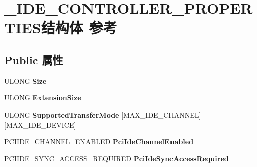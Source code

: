 \hypertarget{struct___i_d_e___c_o_n_t_r_o_l_l_e_r___p_r_o_p_e_r_t_i_e_s}{}\section{\+\_\+\+I\+D\+E\+\_\+\+C\+O\+N\+T\+R\+O\+L\+L\+E\+R\+\_\+\+P\+R\+O\+P\+E\+R\+T\+I\+E\+S结构体 参考}
\label{struct___i_d_e___c_o_n_t_r_o_l_l_e_r___p_r_o_p_e_r_t_i_e_s}
\subsection*{Public 属性}
\begin{DoxyCompactItemize}
\item 
\mbox{\label{struct___i_d_e___c_o_n_t_r_o_l_l_e_r___p_r_o_p_e_r_t_i_e_s_adadd03db9ec8b7e6bd8edc78b04b7b7a}} 
U\+L\+O\+NG {\bfseries Size}
\item 
\mbox{\label{struct___i_d_e___c_o_n_t_r_o_l_l_e_r___p_r_o_p_e_r_t_i_e_s_af0a790ab846c4e32dea1ae9c3404c561}} 
U\+L\+O\+NG {\bfseries Extension\+Size}
\item 
\mbox{\label{struct___i_d_e___c_o_n_t_r_o_l_l_e_r___p_r_o_p_e_r_t_i_e_s_a5fb62d8ee7e7bc95f306756bbb8db4b2}} 
U\+L\+O\+NG {\bfseries Supported\+Transfer\+Mode} \mbox{[}M\+A\+X\+\_\+\+I\+D\+E\+\_\+\+C\+H\+A\+N\+N\+EL\mbox{]}\mbox{[}M\+A\+X\+\_\+\+I\+D\+E\+\_\+\+D\+E\+V\+I\+CE\mbox{]}
\item 
\mbox{\label{struct___i_d_e___c_o_n_t_r_o_l_l_e_r___p_r_o_p_e_r_t_i_e_s_a9b1147b8dae3f85bdb886abe2b3e9e52}} 
P\+C\+I\+I\+D\+E\+\_\+\+C\+H\+A\+N\+N\+E\+L\+\_\+\+E\+N\+A\+B\+L\+ED {\bfseries Pci\+Ide\+Channel\+Enabled}
\item 
\mbox{\label{struct___i_d_e___c_o_n_t_r_o_l_l_e_r___p_r_o_p_e_r_t_i_e_s_aa803ae1be807670e96c4b2e4b161eba5}} 
P\+C\+I\+I\+D\+E\+\_\+\+S\+Y\+N\+C\+\_\+\+A\+C\+C\+E\+S\+S\+\_\+\+R\+E\+Q\+U\+I\+R\+ED {\bfseries Pci\+Ide\+Sync\+Access\+Required}

\end{DoxyCompactItemize}
